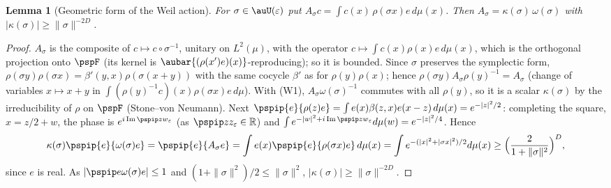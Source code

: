 \documentclass[10pt]{amsart}
\newtheorem{lemma}[theorem]{Lemma}
\theoremstyle{definition}
\theoremstyle{remark}
\newcommand{\R}{\mathbb R}
\newcommand{\Iml}{\operatorname{Im}}
\begin{document}
\begin{lemma}[Geometric form of the Weil action]\label{psp:geom}
For $\sigma\in\auU(\varepsilon)$ put $A_\sigma c=\int c(x)\,\rho(\sigma x)e\,d\mu(x)$. Then
$A_\sigma=\kappa(\sigma)\,\omega(\sigma)$ with $|\kappa(\sigma)|\ge\|\sigma\|^{-2D}$.
\end{lemma}
\begin{proof}
$A_\sigma$ is the composite of $c\mapsto c\circ\sigma^{-1}$, unitary on $L^2(\mu)$, with the operator
$c\mapsto\int c(x)\rho(x)e\,d\mu(x)$, which is the orthogonal projection onto $\pspF$ (its kernel is
$\aubar{(\rho(x')e)(x)}$-reproducing); so it is bounded. Since $\sigma$ preserves the symplectic form,
$\rho(\sigma y)\rho(\sigma x)=\beta'(y,x)\rho(\sigma(x+y))$ with the same cocycle $\beta'$ as for
$\rho(y)\rho(x)$; hence $\rho(\sigma y)A_\sigma\rho(y)^{-1}=A_\sigma$ (change of variables $x\mapsto x+y$
in $\int(\rho(y)^{-1}c)(x)\rho(\sigma x)e\,d\mu$). With (W1), $A_\sigma\omega(\sigma)^{-1}$ commutes with
all $\rho(y)$, so it is a scalar $\kappa(\sigma)$ by the irreducibility of $\rho$ on $\pspF$ (Stone--von
Neumann). Next $\pspip{e}{\rho(z)e}=\int e(x)\beta(z,x)e(x-z)\,d\mu(x)=e^{-|z|^2/2}$: completing the
square, $x=z/2+w$, the phase is $e^{i\Iml\pspip zw_\varepsilon}$ (as $\pspip zz_\varepsilon\in\R$) and
$\int e^{-|w|^2+i\Iml\pspip zw_\varepsilon}d\mu(w)=e^{-|z|^2/4}$. Hence
\[
\kappa(\sigma)\pspip{e}{\omega(\sigma)e}=\pspip{e}{A_\sigma e}=\int
e(x)\pspip{e}{\rho(\sigma x)e}\,d\mu(x)=\int e^{-(|x|^2+|\sigma x|^2)/2}d\mu(x)\ge
\Bigl(\frac{2}{1+\|\sigma\|^2}\Bigr)^D ,
\]
since $e$ is real. As $|\pspip e{\omega(\sigma)e}|\le1$ and $(1+\|\sigma\|^2)/2\le
\|\sigma\|^2$, $|\kappa(\sigma)|\ge\|\sigma\|^{-2D}$.
\end{proof}
\end{document}
